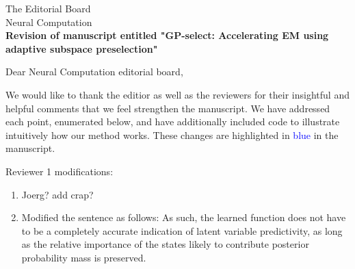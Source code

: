 \documentclass[10pt]{letter}
\begin{document}
\begin{letter}{
The Editorial Board\\
Neural Computation\\
\vspace{10mm}
\textbf{Revision of manuscript entitled "GP-select: Accelerating EM using adaptive
subspace preselection"}
}

%
%
%
%
%
%
% 

\opening{Dear Neural Computation editorial board,}

We would like to thank the editior as well as the reviewers for their insightful and helpful comments that we feel strengthen the manuscript.  We have addressed each point, enumerated below, and have additionally included code to illustrate intuitively how our method works. These changes are highlighted in \textcolor{blue}{blue} in the manuscript.

Reviewer 1 modifications:

\begin{enumerate}
    \item Joerg? add crap?
    
    \item Modified the sentence as follows: 
As such, the learned function does not have to be a completely accurate
indication of latent variable predictivity, as long as the relative importance of the states
likely to contribute posterior probability mass is preserved.


\end{enumerate}
\end{letter}
\end{document}
